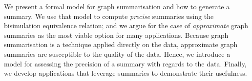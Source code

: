 \vspace{-.2cm}
We present a formal model for graph summarisation and how to generate a summary.
We use that model to compute \emph{precise} summaries using the bisimulation equivalence relation; and we argue for the case of \emph{approximate} graph summaries as the most viable option for many applications.
Because graph summarisation is a technique applied directly on the data, approximate graph summaries are susceptible to the quality of the data.
Hence, we introduce a model for assessing the precision of a summary with regards to the data.
Finally, we develop applications that leverage summaries to demonstrate their usefulness.
